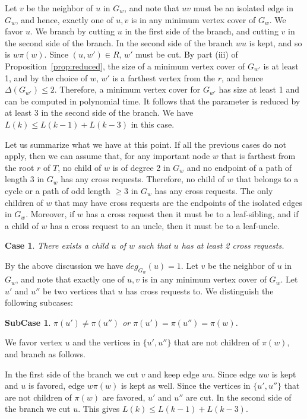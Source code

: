\documentclass[11pt]{article}
\newtheorem{case}[theorem]{Case}
\newtheorem{subcase}[theorem]{SubCase}
\begin{document}
Let $v$ be the neighbor of $u$ in $G_w$, and note that $uv$ must be an isolated edge in $G_w$, and hence, exactly one of $u, v$ is in any minimum vertex cover of $G_w$. We favor $u$. We branch by cutting $u$ in the first side of the branch, and cutting $v$ in the second side of the branch. In the second side of the branch $wu$ is kept, and so is $w\pi(w)$. Since $(u, w') \in R$, $w'$ must be cut. By part (iii) of Proposition~\ref{prop:reduced}, the size of a minimum vertex cover of $G_{w'}$ is at least 1, and by the choice of $w$, $w'$ is a farthest vertex from the $r$, and hence $\Delta(G_{w'}) \leq 2$. Therefore, a minimum vertex cover for $G_{w'}$ has size at least 1 and can be computed in polynomial time. It follows that the parameter is reduced by at least 3 in the second side of the branch. We have $L(k) \leq L(k-1) + L(k-3)$ in this case.

Let us summarize what we have at this point. If all the previous cases do not apply, then we can assume that, for any important node $w$ that is farthest from the root $r$ of $T$, no child of $w$ is of degree 2 in $G_w$ and no endpoint of a path of length 3 in $G_w$ has any cross requests. Therefore, no child of $w$ that belongs to a cycle or a path of odd length $\geq 3$ in $G_w$ has any cross requests. The only children of $w$ that may have cross requests are the endpoints of the isolated edges in $G_w$. Moreover, if $w$ has a cross request then it must be to a leaf-sibling, and if a child of $w$ has a cross request to an uncle, then it must be to a leaf-uncle.



\begin{case}\label{case:3}
There exists a child $u$ of $w$ such that $u$ has at least 2 cross requests.
\end{case}

By the above discussion we have $deg_{G_w}(u) =1$. Let $v$ be the neighbor of $u$ in $G_w$, and note that exactly one of $u, v$ is in any minimum vertex cover of $G_w$. Let $u'$ and $u''$ be two vertices that $u$ has cross requests to. We distinguish the following subcases:

\begin{subcase}\label{subcase:31}
$\pi(u') \neq \pi(u'')$ or $\pi(u') = \pi(u'') = \pi(w)$.
\end{subcase}


We favor vertex $u$ and the vertices in $\{u', u''\}$ that are not children of $\pi(w)$, and branch as follows.

In the first side of the branch we cut $v$ and keep edge $wu$. Since edge $uw$ is kept and $u$ is favored, edge $w\pi(w)$ is kept as well. Since the vertices in $\{u', u''\}$ that are not children of $\pi(w)$ are favored, $u'$ and $u''$ are cut. In the second side of the branch we cut $u$. This gives $L(k) \leq L(k-1) + L(k-3)$.
\end{document}
